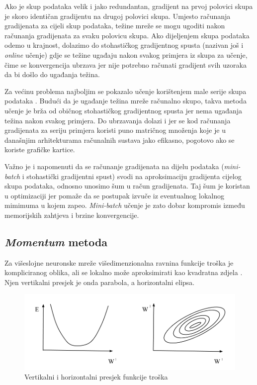 \documentclass[times, utf8, diplomski, numeric]{fer}
\begin{document}
Ako je skup podataka velik i jako redundantan, gradijent na prvoj polovici skupa je skoro identičan gradijentu na drugoj polovici skupa. Umjesto računanja gradijenata za cijeli skup podataka, težine mreže se mogu ugoditi nakon računanja gradijenata za svaku polovicu skupa. Ako dijeljenjem skupa podataka odemo u krajnost, dolazimo do stohastičkog gradijentnog spusta (nazivan još i \emph{online} učenje) gdje se težine ugađaju nakon svakog primjera iz skupa za učenje, čime se konvergencija ubrzava jer nije potrebno računati gradijent svih uzoraka da bi došlo do ugađanja težina.

Za većinu problema najboljim se pokazalo učenje korištenjem male serije skupa podataka . Budući da je ugađanje težina mreže računalno skupo, takva metoda učenje je brža od običnog stohastičkog gradijentnog spusta jer nema ugađanja težina nakon svakog primjera. Do ubrzavanja dolazi i jer se kod računanja gradijenata za seriju primjera koristi puno matričnog množenja koje je u današnjim arhitekturama računalnih sustava jako efikasno, pogotovo ako se koriste grafičke kartice.

Važno je i napomenuti da se računanje gradijenata na dijelu podataka (\textit{mini-batch} i stohastički gradijentni spust) svodi na aproksimaciju gradijenta cijelog skupa podataka, odnosno unosimo šum u račun gradijenata.
Taj šum je koristan u optimizaciji jer pomaže da se postupak izvuče iz eventualnog lokalnog mimimuma u kojem zapeo. \textit{Mini-batch} učenje je zato dobar kompromis između memorijskih zahtjeva i brzine konvergencije.


\subsection{\emph{Momentum} metoda}

Za višeslojne neuronske mreže višedimenzionalna ravnina funkcije troška je kompliciranog oblika, ali se lokalno može aproksimirati kao kvadratna zdjela . Njen vertikalni presjek je onda parabola, a horizontalni elipsa.

\begin{figure}[htb]
\centering
\includegraphics[width=\textwidth]{imgs/cost_img.png}
\caption{Vertikalni i horizontalni presjek funkcije troška}
\label{fig:quad_bowl}
\end{figure}
\end{document}
